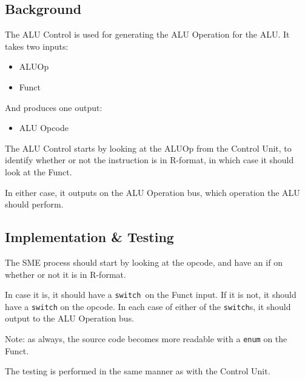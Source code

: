 \documentclass{beamer}
\begin{document}
\subsection{Background}
\begin{frame}
    The ALU Control is used for generating the ALU Operation for the ALU. It
    takes two inputs:
    \begin{itemize}
        \item ALUOp
        \item Funct
    \end{itemize}
    And produces one output:
    \begin{itemize}
        \item ALU Opcode
    \end{itemize}
\end{frame}
\begin{frame}
    \begin{figure}
    \end{figure}
\end{frame}
\begin{frame}
    The ALU Control starts by looking at the ALUOp from the Control Unit, to
    identify whether or not the instruction is in R-format, in which case it
    should look at the Funct.

    \vspace{\baselineskip}
    In either case, it outputs on the ALU Operation bus, which operation the
    ALU should perform.
\end{frame}
\subsection{Implementation \& Testing}
\begin{frame}
    The SME process should start by looking at the opcode, and have an if on
    whether or not it is in R-format.

    \vspace{\baselineskip}
    In case it is, it should have a \texttt{switch} on the Funct input. If
    it is not, it should have a \texttt{switch} on the opcode. In each case of
    either of the \texttt{switch}s, it should output to the ALU Operation bus.

    \vspace{\baselineskip}
    Note: as always, the source code becomes more readable with a \texttt{enum}
    on the Funct.

    \vspace{\baselineskip}
    The testing is performed in the same manner as with the Control Unit.
\end{frame}
\end{document}
